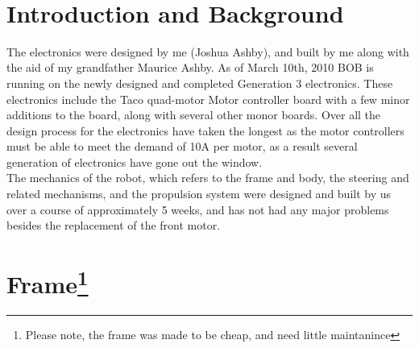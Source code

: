 \documentclass{article}
\begin{document}
\newpage

\\

\section{Introduction and Background}
The electronics were designed by me (Joshua Ashby), and built by me along with the aid of my grandfather Maurice Ashby. As of March 10th, 2010 BOB is running on the newly designed and completed Generation 3 electronics. These electronics include the Taco quad-motor Motor controller board with a few minor additions to the board, along with several other monor boards. Over all the design process for the electronics have taken the longest as the motor controllers must be able to meet the demand of 10A per motor, as a result several generation of electronics have gone out the window.\\
The mechanics of the robot, which refers to the frame and body, the steering and related mechanisms, and the propulsion system were designed and built by us over a course of approximately 5 weeks, and has not had any major problems besides the replacement of the front motor.\\
\section{Frame\footnote{Please note, the frame was made to be cheap, and need little maintanince}%
}
\end{document}
